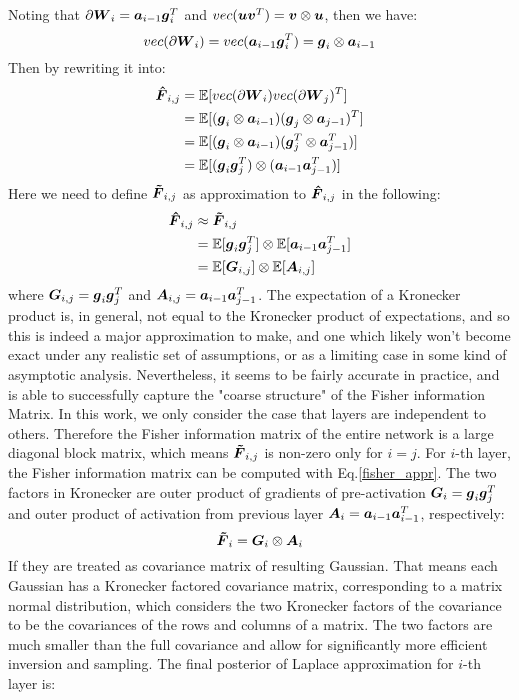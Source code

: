 Noting that $\partial \boldsymbol W_i = \boldsymbol a_{i-1}\boldsymbol g_i^T$ and $vec(\boldsymbol u \boldsymbol v^T) = \boldsymbol v \otimes \boldsymbol u$, then we have: 
\[
vec(\partial \boldsymbol W_i) = vec(\boldsymbol a_{i-1}\boldsymbol g_{i}^T) = \boldsymbol g_i \otimes \boldsymbol a_{i-1}
\]
Then by rewriting it into: 
\[
\begin{aligned}
\boldsymbol{\hat F}_{i,j} &=  \mathbb E[vec(\partial\boldsymbol W_i)vec(\partial\boldsymbol W_j)^T]\\
&=\mathbb E[(\boldsymbol g_i \otimes \boldsymbol a_{i-1})(\boldsymbol g_j \otimes \boldsymbol a_{j-1})^T]\\
&=\mathbb E[(\boldsymbol g_i \otimes \boldsymbol a_{i-1})(\boldsymbol g_j^T \otimes \boldsymbol a_{j-1}^T)]\\
&=\mathbb E[(\boldsymbol g_i \boldsymbol g_j^T)\otimes(\boldsymbol a_{i-1}  \boldsymbol a_{j-1}^T)]
\end{aligned}
\]
Here we need to define $\boldsymbol{\tilde{F}}_{i,j}$ as approximation to $\boldsymbol{\hat F}_{i,j}$ in the following:
\begin{equation}
\begin{aligned}\label{fisher_appr}
\boldsymbol{\hat F}_{i,j} &\approx \boldsymbol{\tilde{F}}_{i,j} \\
&=\mathbb E[\boldsymbol g_i \boldsymbol g_j^T] \otimes \mathbb E[\boldsymbol a_{i-1} \boldsymbol a_{j-1}^T] \\
&= \mathbb E[\boldsymbol G_{i,j}] \otimes \mathbb E[\boldsymbol A_{i,j}]
\end{aligned}
\end{equation}
where $\boldsymbol G_{i,j} = \boldsymbol g_i \boldsymbol g_j^T$ and $\boldsymbol A_{i,j} = \boldsymbol a_{i-1}\boldsymbol a_{j-1}^T$. The expectation of a Kronecker product is, in general, not equal to the Kronecker product of expectations, and so this
is indeed a major approximation to make, and one which likely won't become exact under any realistic set of assumptions, or as a limiting case in some kind of asymptotic analysis. Nevertheless, it seems to be fairly accurate in practice, and is able to successfully capture the "coarse structure" of the Fisher information Matrix. 
In this work, we only consider the case that layers are independent to others. Therefore the Fisher information matrix of the entire network is a large diagonal block matrix, which means $\boldsymbol{\tilde{F}}_{i,j}$ is non-zero only for $i=j$. For $i$-th layer, the Fisher information matrix can be computed with Eq.\ref{fisher_appr}. The two factors in Kronecker are outer product of gradients of pre-activation $\boldsymbol G_i = \boldsymbol g_i \boldsymbol g_j^T$ and outer product of activation from previous layer $\boldsymbol A_{i} = \boldsymbol a_{i-1}\boldsymbol a_{i-1}^T$, respectively:
\[
\boldsymbol{\tilde{F}}_{i} = \boldsymbol G_i \otimes \boldsymbol A_i
\] 
If they are treated as covariance matrix of resulting Gaussian. That means each Gaussian has a Kronecker factored covariance matrix, corresponding to a matrix normal distribution\cite{gupta1999matrix}, which considers the two Kronecker factors of the covariance to be the covariances of the rows and columns of a matrix. The two factors are much smaller than the full covariance and allow for significantly more efficient inversion and sampling. The final posterior of Laplace approximation for $i$-th layer is:
